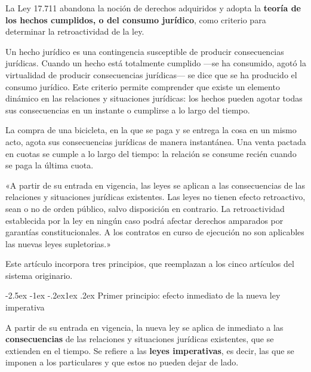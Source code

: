 \documentclass[12pt,oneside]{book}
\makeatletter
\renewcommand\subsection{\@startsection{subsection}{2}{\z@}%
  {-2.5ex \@plus -1ex \@minus -.2ex}{1ex \@plus .2ex}%
  {\normalfont\normalsize\bfseries}}
\makeatother
\begin{document}
\begin{importante}
La Ley 17.711 abandona la noción de derechos adquiridos y adopta la \textbf{teoría de los hechos cumplidos, o del consumo jurídico}, como criterio para determinar la retroactividad de la ley.
\end{importante}

\begin{definicion}
Un hecho jurídico es una contingencia susceptible de producir consecuencias jurídicas. Cuando un hecho está totalmente cumplido ---se ha consumido, agotó la virtualidad de producir consecuencias jurídicas--- se dice que se ha producido el consumo jurídico. Este criterio permite comprender que existe un elemento dinámico en las relaciones y situaciones jurídicas: los hechos pueden agotar todas sus consecuencias en un instante o cumplirse a lo largo del tiempo.
\end{definicion}

\begin{ejemplo}
La compra de una bicicleta, en la que se paga y se entrega la cosa en un mismo acto, agota sus consecuencias jurídicas de manera instantánea. Una venta pactada en cuotas se cumple a lo largo del tiempo: la relación se consume recién cuando se paga la última cuota.
\end{ejemplo}

\begin{regla}
«A partir de su entrada en vigencia, las leyes se aplican a las consecuencias de las relaciones y situaciones jurídicas existentes. Las leyes no tienen efecto retroactivo, sean o no de orden público, salvo disposición en contrario. La retroactividad establecida por la ley en ningún caso podrá afectar derechos amparados por garantías constitucionales. A los contratos en curso de ejecución no son aplicables las nuevas leyes supletorias.»
\end{regla}

Este artículo incorpora tres principios, que reemplazan a los cinco artículos del sistema originario.

\subsection{Primer principio: efecto inmediato de la nueva ley imperativa}

\begin{definicion}
A partir de su entrada en vigencia, la nueva ley se aplica de inmediato a las \textbf{consecuencias} de las relaciones y situaciones jurídicas existentes, que se extienden en el tiempo. Se refiere a las \textbf{leyes imperativas}, es decir, las que se imponen a los particulares y que estos no pueden dejar de lado.
\end{definicion}
\end{document}
